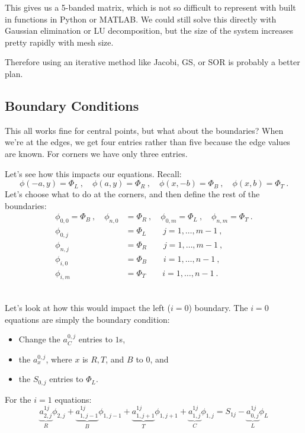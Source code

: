\documentclass[12pt]{exam}
\begin{document}
This gives us a 5-banded matrix, which is not so difficult to represent with built in functions in Python or MATLAB. We could still solve this directly with Gaussian elimination or LU decomposition, but the size of the system increases pretty rapidly with mesh size.

Therefore using an iterative method like Jacobi, GS, or SOR is probably a better plan. 


\subsection*{Boundary Conditions}

This all works fine for central points, but what about the boundaries? When we're at the edges, we get four entries rather than five because the edge values are known. For corners we have only three entries. 

Let's see how this impacts our equations. Recall:
%
\[\phi(-a,y) = \Phi_L\:, \quad \phi(a,y) = \Phi_R\:, \quad \phi(x,-b) = \Phi_B\:, \quad \phi(x,b) = \Phi_T\:.\]
%
Let's choose what to do at the corners, and then define the rest of the boundaries:
%
\ifprintanswers
\begin{align}
\phi_{0,0} = \Phi_B\:, \quad \phi_{n,0} &= \Phi_R\:, \quad \phi_{0,m} = \Phi_L\:, \quad \phi_{n,m} = \Phi_T\:. \nonumber \\
\phi_{0,j} &= \Phi_L \qquad j=1,\dots,m-1 \:, \nonumber \\
\phi_{n,j} &= \Phi_R \qquad j=1,\dots,m-1 \:, \nonumber \\
\phi_{i,0} &= \Phi_B \qquad i=1,\dots,n-1 \:, \nonumber \\
\phi_{i,m} &= \Phi_T \qquad i=1,\dots,n-1 \:. \nonumber 
\end{align}
\else
\\ \vspace*{8em}
\fi

Let's look at how this would impact the left ($i=0$) boundary. The $i=0$ equations are simply the boundary condition:
\begin{itemize}
\item Change the $a_{C}^{0,j}$ entries to $1$s, 
\item the $a_{x}^{0,j}$, where $x$ is $R, T$, and $B$ to $0$, and 
\item the $S_{0,j}$ entries to $\Phi_L$.
\end{itemize} 

For the $i=1$ equations:
\[\underbrace{a_{2,j}^{1j}}_{R}\phi_{2,j} + \underbrace{a_{1,j-1}^{1j}}_{B}\phi_{1,j-1} + \underbrace{a_{1,j+1}^{1j}}_{T}\phi_{1,j+1} + \underbrace{a_{1,j}^{1j}}_{C}\phi_{1,j} = S_{1j} - \underbrace{a_{0,j}^{1j}}_{L}\phi_L \]
\end{document}
